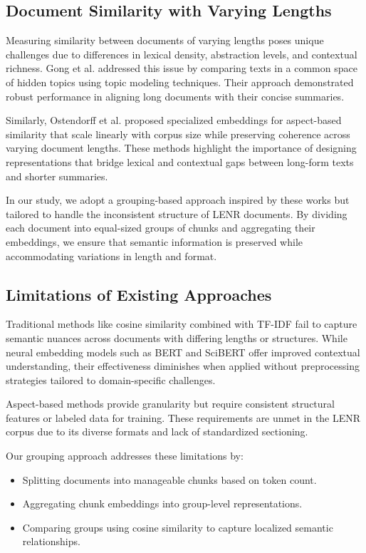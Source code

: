 \documentclass[12pt]{article}
\begin{document}
    \subsection{Document Similarity with Varying Lengths}
    
    Measuring similarity between documents of varying lengths poses unique challenges due to differences in lexical density, abstraction levels, and contextual richness. Gong et al. \cite{gong2018hidden} addressed this issue by comparing texts in a common space of hidden topics using topic modeling techniques. Their approach demonstrated robust performance in aligning long documents with their concise summaries.
    
    Similarly, Ostendorff et al. \cite{Ostendorff2020} proposed specialized embeddings for aspect-based similarity that scale linearly with corpus size while preserving coherence across varying document lengths. These methods highlight the importance of designing representations that bridge lexical and contextual gaps between long-form texts and shorter summaries.
    
    In our study, we adopt a grouping-based approach inspired by these works but tailored to handle the inconsistent structure of LENR documents. By dividing each document into equal-sized groups of chunks and aggregating their embeddings, we ensure that semantic information is preserved while accommodating variations in length and format.
    
    \subsection{Limitations of Existing Approaches}
    
    Traditional methods like cosine similarity combined with TF-IDF \cite{kdnuggets2025evaluating} fail to capture semantic nuances across documents with differing lengths or structures. While neural embedding models such as BERT \cite{devlin2019bert} and SciBERT \cite{beltagy2019scibert} offer improved contextual understanding, their effectiveness diminishes when applied without preprocessing strategies tailored to domain-specific challenges.
    
    Aspect-based methods provide granularity but require consistent structural features or labeled data for training. These requirements are unmet in the LENR corpus due to its diverse formats and lack of standardized sectioning.
    
    Our grouping approach addresses these limitations by:
    \begin{itemize}
        \item Splitting documents into manageable chunks based on token count.
        \item Aggregating chunk embeddings into group-level representations.
        \item Comparing groups using cosine similarity to capture localized semantic relationships.
    \end{itemize}
    
\end{document}
